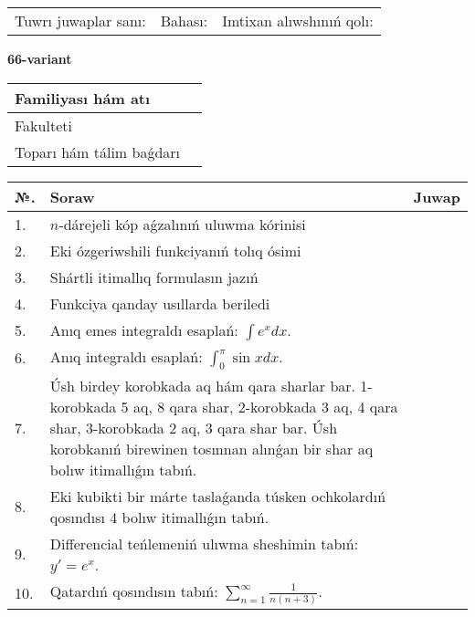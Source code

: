 \documentclass{article}
\begin{document}
\vspace{1cm}

\begin{tabular}{ c c c }
Tuwrı juwaplar sanı: \underline{\hspace{2cm}} & Bahası: \underline{\hspace{2cm}} & Imtixan alıwshınıń qolı: \underline{\hspace{2cm}} \\
\end{tabular}

\newpage

\begin{center}\textbf{66-variant}\end{center}

\bgroup
\def\arraystretch{1.5}
\begin{tabular}{ |m{6cm}|m{10cm}| }
  \hline
  Familiyası hám atı & \\
  \hline
  Fakulteti &\\
  \hline
  Toparı hám tálim baǵdarı & \\
  \hline
\end{tabular}
\egroup

\vspace{0.5cm}

\bgroup
\def\arraystretch{2}
\begin{tabular}{ |l|m{8cm}|m{7cm}| }
  \hline
  №. & Soraw & Juwap \\
  \hline
  1. & $n$-dárejeli kóp aǵzalınıń uluwma kórinisi &  \\
  \hline
  2. & Eki ózgeriwshili funkciyanıń tolıq ósimi &  \\
  \hline
  3. & Shártli itimallıq formulasın jazıń &  \\
  \hline
  4. & Funkciya qanday usıllarda beriledi &  \\
  \hline
  5. & Anıq emes integraldı esaplań: $\displaystyle\int e^{x}dx$. &  \\
  \hline
  6. & Anıq integraldı esaplań: $\displaystyle\int_{0}^{\pi}\sin xdx$. &  \\
  \hline
  7. & Úsh birdey korobkada aq hám qara sharlar bar. 1-korobkada 5 aq, 8 qara shar, 2-korobkada 3 aq, 4 qara shar, 3-korobkada 2 aq, 3 qara shar bar. Úsh korobkanıń birewinen tosınnan alınǵan bir shar aq bolıw itimallıǵın tabıń. &  \\
  \hline
  8. & Eki kubikti bir márte taslaǵanda túsken ochkolardıń qosındısı 4 bolıw itimallıǵın tabıń. &  \\
  \hline
  9. & Differencial teńlemeniń ulıwma sheshimin tabıń: $y'=e^{x}$. &  \\
  \hline
  10. & Qatardıń qosındısın tabıń: $\displaystyle\sum_{n = 1}^{\infty}\frac{1}{n(n + 3)}$. &  \\
  \hline
\end{tabular}
\egroup
\end{document}
